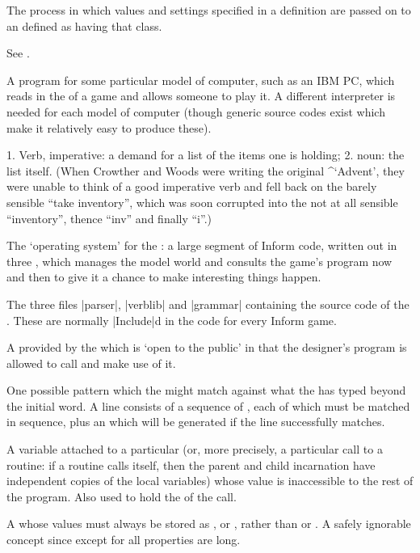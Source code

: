 {{{%
The process in which  values and  settings specified
in a  definition are passed on to an  defined as having
that class.

%
See .

%
A program for some particular model of computer, such as an IBM PC, which
reads in the  of a game and allows someone to play it.  A
different interpreter is needed for each model of computer (though generic
source codes exist which make it relatively easy to produce these).

%
1. Verb, imperative: a demand for a list of the items one is holding; 2.
noun: the list itself.  (When Crowther and Woods were writing the original
^{`Advent'}, they were unable to think of a good imperative verb and fell
back on the barely sensible ``take inventory'', which was soon corrupted
into the not at all sensible ``inventory'', thence ``inv'' and finally
``i''.)

%
The `operating system' for the : a large segment of Inform
code, written out in three , which manages the model world
and consults the game's program now and then to give it a chance to
make interesting things happen.

%
The three files |parser|, |verblib| and |grammar| containing the source
code of the .  These are normally |Include|d in the code for
every Inform game.

%
A  provided by the  which is `open to the public'
in that the designer's program is allowed to call and make use of it.

%
One possible pattern which the  might match against what the
 has typed beyond the initial  word.  A  line
consists of a sequence of , each of which must be matched
in sequence, plus an  which will be generated if the line
successfully matches.

%
A variable attached to a particular  (or, more precisely,
a particular call to a routine: if a routine calls itself, then the parent
and child incarnation have independent copies of the local variables) whose
value is inaccessible to the rest of the program.  Also used to hold the
 of the call.

%
A  whose values must always be stored as , or
, rather than  or .  A safely
ignorable concept since except for  all properties are
long.

}}}
